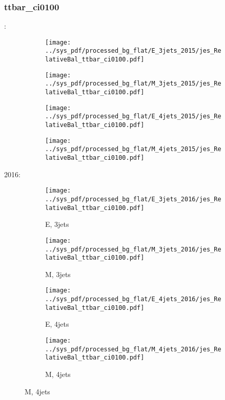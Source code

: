 \documentclass{beamer}
\begin{document}
\begin{frame}
\frametitle{ttbar_ci0100}
\fontsize{5}{1}:
\begin{figure}
\centering
\begin{subfigure}[b]{0.24\textwidth}
\texttt{[image: ../sys\_pdf/processed\_bg\_flat/E\_3jets\_2015/jes\_RelativeBal\_ttbar\_ci0100.pdf]}
\end{subfigure}
\begin{subfigure}[b]{0.24\textwidth}
\texttt{[image: ../sys\_pdf/processed\_bg\_flat/M\_3jets\_2015/jes\_RelativeBal\_ttbar\_ci0100.pdf]}
\end{subfigure}
\begin{subfigure}[b]{0.24\textwidth}
\texttt{[image: ../sys\_pdf/processed\_bg\_flat/E\_4jets\_2015/jes\_RelativeBal\_ttbar\_ci0100.pdf]}
\end{subfigure}
\begin{subfigure}[b]{0.24\textwidth}
\texttt{[image: ../sys\_pdf/processed\_bg\_flat/M\_4jets\_2015/jes\_RelativeBal\_ttbar\_ci0100.pdf]}
\end{subfigure}
\end{figure}
2016:
\begin{figure}
\centering
\begin{subfigure}[b]{0.24\textwidth}
\texttt{[image: ../sys\_pdf/processed\_bg\_flat/E\_3jets\_2016/jes\_RelativeBal\_ttbar\_ci0100.pdf]}
\captionsetup{font=tiny}
\caption{E, 3jets}
\end{subfigure}
\begin{subfigure}[b]{0.24\textwidth}
\texttt{[image: ../sys\_pdf/processed\_bg\_flat/M\_3jets\_2016/jes\_RelativeBal\_ttbar\_ci0100.pdf]}
\captionsetup{font=tiny}
\caption{M, 3jets}
\end{subfigure}
\begin{subfigure}[b]{0.24\textwidth}
\texttt{[image: ../sys\_pdf/processed\_bg\_flat/E\_4jets\_2016/jes\_RelativeBal\_ttbar\_ci0100.pdf]}
\captionsetup{font=tiny}
\caption{E, 4jets}
\end{subfigure}
\begin{subfigure}[b]{0.24\textwidth}
\texttt{[image: ../sys\_pdf/processed\_bg\_flat/M\_4jets\_2016/jes\_RelativeBal\_ttbar\_ci0100.pdf]}
\captionsetup{font=tiny}
\caption{M, 4jets}
\end{subfigure}
\end{figure}
\end{frame}
\end{document}
